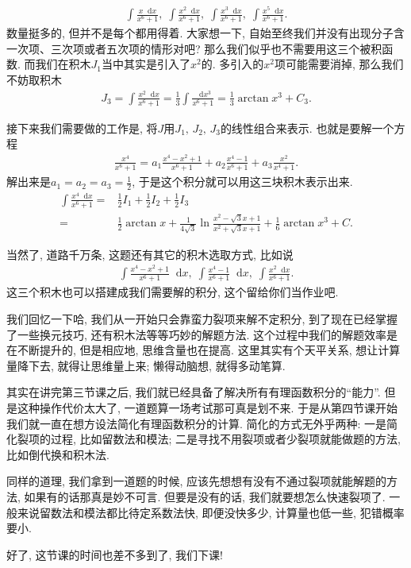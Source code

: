 \documentclass{ctexbook}
\newcommand*{\dif}{\mathop{}\!\mathrm{d}}
\begin{document}
{\begin{align*}
\int\frac{x\dif{x}}{x^{6}+1},\;\int\frac{x^{2}\dif{x}}{x^{6}+1},\;\int\frac{x^{3}\dif{x}}{x^{6}+1},\;\int\frac{x^{5}\dif{x}}{x^{6}+1}
.\end{align*}
数量挺多的, 但并不是每个都用得着. 大家想一下, 自始至终我们并没有出现分子含一次项、三次项或者五次项的情形对吧? 那么我们似乎也不需要用这三个被积函数. 而我们在积木$J_{1}$当中其实是引入了$x^{2}$的. 多引入的$x^{2}$项可能需要消掉, 那么我们不妨取积木
\begin{align*}
J_{3}=\int\frac{x^{2}\dif{x}}{x^{6}+1}=\frac{1}{3}\int\frac{\dif{x^{3}}}{x^{6}+1}=\frac{1}{3}\arctan{x^{3}}+C_{3}
.\end{align*}\par
接下来我们需要做的工作是, 将$J$用$J_{1},\,J_{2},\,J_{3}$的线性组合来表示. 也就是要解一个方程
\begin{align*}
\frac{x^{4}}{x^{6}+1}=a_{1}\frac{x^{4}-x^{2}+1}{x^{6}+1}+a_{2}\frac{x^{4}-1}{x^{6}+1}+a_{3}\frac{x^{2}}{x^{4}+1}
.\end{align*}
解出来是$a_{1}=a_{2}=a_{3}=\frac{1}{2}$, 于是这个积分就可以用这三块积木表示出来. 
\begin{align*}
\int\frac{x^{4}\dif{x}}{x^{6}+1}={}&\frac{1}{2}I_{1}+\frac{1}{2}I_{2}+\frac{1}{2}I_{3}\\
={}&\frac{1}{2}\arctan{x}+\frac{1}{4\sqrt{3}}\ln{\frac{x^{2}-\sqrt{3}x+1}{x^{2}+\sqrt{3}x+1}}+\frac{1}{6}\arctan{x^{3}}+C
.\end{align*}\par
当然了, 道路千万条, 这题还有其它的积木选取方式, 比如说
\begin{align*}
\int\frac{x^{4}-x^{2}+1}{x^{6}+1}\dif{x},\;\int\frac{x^{4}-1}{x^{6}+1}\dif{x},\;\int\frac{x^{2}\dif{x}}{x^{6}+1}
.\end{align*}
这三个积木也可以搭建成我们需要解的积分, 这个留给你们当作业吧. \par
我们回忆一下哈, 我们从一开始只会靠蛮力裂项来解不定积分, 到了现在已经掌握了一些换元技巧, 还有积木法等等巧妙的解题方法. 这个过程中我们的解题效率是在不断提升的, 但是相应地, 思维含量也在提高. 这里其实有个天平关系, 想让计算量降下去, 就得让思维量上来; 懒得动脑想, 就得多动笔算. \par
其实在讲完第三节课之后, 我们就已经具备了解决所有有理函数积分的“能力”. 但是这种操作代价太大了, 一道题算一场考试那可真是划不来. 于是从第四节课开始我们就一直在想方设法简化有理函数积分的计算. 简化的方式无外乎两种: 一是简化裂项的过程, 比如留数法和模法; 二是寻找不用裂项或者少裂项就能做题的方法, 比如倒代换和积木法. \par
同样的道理, 我们拿到一道题的时候, 应该先想想有没有不通过裂项就能解题的方法, 如果有的话那真是妙不可言. 但要是没有的话, 我们就要想怎么快速裂项了. 一般来说留数法和模法都比待定系数法快, 即便没快多少, 计算量也低一些, 犯错概率要小. \par
好了, 这节课的时间也差不多到了, 我们下课! \par
}
\end{document}

